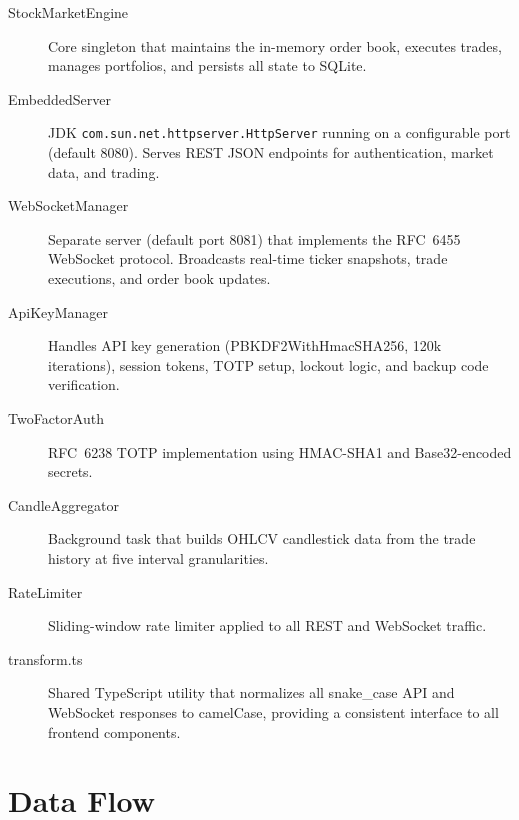 \documentclass[12pt,a4paper]{report}
\begin{document}
\begin{description}
\item[StockMarketEngine] Core singleton that maintains the in-memory order book,
  executes trades, manages portfolios, and persists all state to SQLite.
\item[EmbeddedServer] JDK \texttt{com.sun.net.httpserver.HttpServer} running on a
  configurable port (default 8080). Serves REST JSON endpoints for
  authentication, market data, and trading.
\item[WebSocketManager] Separate server (default port 8081) that implements the
  RFC~6455 WebSocket protocol. Broadcasts real-time ticker snapshots, trade
  executions, and order book updates.
\item[ApiKeyManager] Handles API key generation (PBKDF2WithHmacSHA256, 120k
  iterations), session tokens, TOTP setup, lockout logic, and backup code
  verification.
\item[TwoFactorAuth] RFC~6238 TOTP implementation using HMAC-SHA1 and
  Base32-encoded secrets.
\item[CandleAggregator] Background task that builds OHLCV candlestick data
  from the trade history at five interval granularities.
\item[RateLimiter] Sliding-window rate limiter applied to all REST and
  WebSocket traffic.
\item[transform.ts] Shared TypeScript utility that normalizes all
  snake\_case API and WebSocket responses to camelCase,
  providing a consistent interface to all frontend components.
\end{description}

\section{Data Flow}
\end{document}
